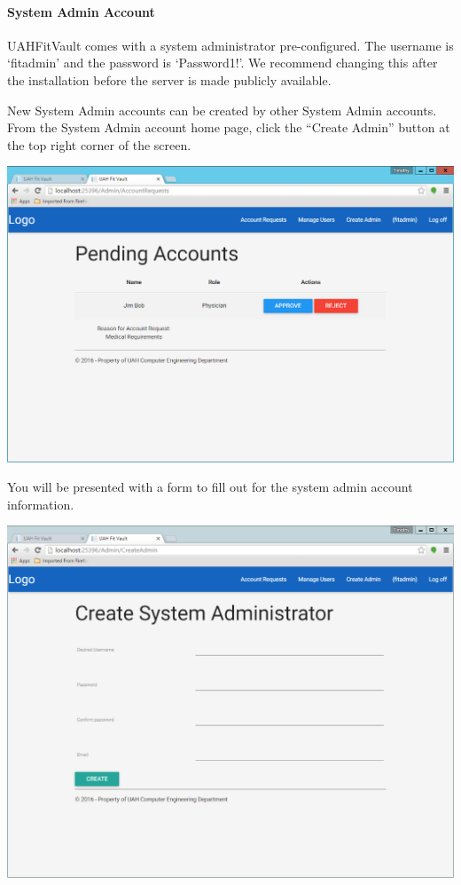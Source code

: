 \documentclass[letterpaper,10pt,english]{sphinxmanual}
\begin{document}
\paragraph{System Admin Account}
\label{user_guide/account_creation:system-admin-account}
UAHFitVault comes with a system administrator pre-configured. The username is `fitadmin' and the password is `Password1!'.
We recommend changing this after the installation before the server is made publicly available.

New System Admin accounts can be created by other System Admin accounts. From the System Admin account home page, click
the ``Create Admin'' button at the top right corner of the screen.

\includegraphics{account_approval.png}

You will be presented with a form to fill out for the system admin account information.

\includegraphics{create_admin.png}
\end{document}

